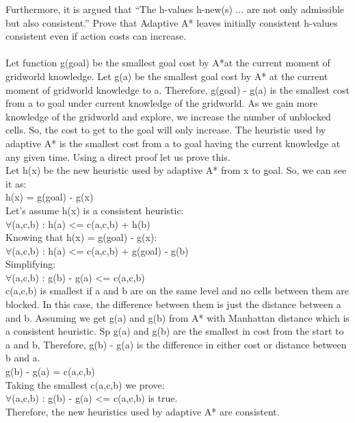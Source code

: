 \documentclass[a4paper]{article}
\theoremstyle{definition}
\theoremstyle{plain}
\begin{document}
Furthermore, it is argued that “The h-values h-new(s) ... are not only admissible but also consistent.” Prove that Adaptive A* leaves initially consistent h-values consistent even if action costs can increase. \\\\
Let function g(goal) be the smallest goal cost by A*at the current moment of gridworld knowledge. Let g(a) be the smallest goal cost by A* at the current moment of gridworld knowledge to a. Therefore, g(goal) - g(a) is the smallest cost from a to goal under current knowledge of the gridworld. As we gain more knowledge of the gridworld and explore, we increase the number of unblocked cells. So, the cost to get to the goal will only increase. The heuristic used by adaptive A* is the smallest cost from a to goal having the current knowledge at any given time. Using a direct proof let us prove this. \\
Let h(x) be the new heuristic used by adaptive A* from x to goal. So, we can see it as:\\
	h(x) = g(goal) - g(x)\\
Let’s assume h(x) is a consistent heuristic: \\
	$\forall$(a,c,b) : h(a) <= c(a,c,b) + h(b)\\
Knowing that h(x) = g(goal) - g(x):\\
    $\forall$(a,c,b) : h(a) <= c(a,c,b) + g(goal) - g(b)\\
Simplifying:\\
    $\forall$(a,c,b) : g(b) - g(a) <= c(a,c,b)\\
c(a,c,b) is smallest if a and b are on the same level and no cells between them are blocked. In this case, the difference between them is just the distance between a and b. Assuming we get g(a) and g(b) from A* with Manhattan distance which is a consistent heuristic. Sp g(a) and g(b) are the smallest in cost from the start to a and b, Therefore, g(b) - g(a) is the difference in either cost or distance between b and a. \\
	g(b) - g(a) = c(a,c,b)\\
Taking the smallest c(a,c,b) we prove:\\
	 $\forall$(a,c,b) : g(b) - g(a) <= c(a,c,b) is true. \\
Therefore, the new heuristics used by adaptive A* are consistent. \\
\end{document}
